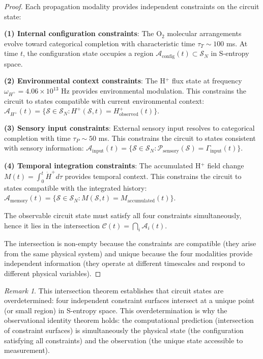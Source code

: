 \documentclass[aps,prd,twocolumn,superscriptaddress,floatfix,nofootinbib]{revtex4-2}
\theoremstyle{remark}
\newtheorem{remark}[theorem]{Remark}
\begin{document}
\begin{proof}
Each propagation modality provides independent constraints on the circuit state:

\textbf{(1) Internal configuration constraints}: The O$_2$ molecular arrangements evolve toward categorical completion with characteristic time $\tau_T \sim 100$ ms. At time $t$, the configuration state occupies a region $\mathcal{A}_{\text{config}}(t) \subset \mathcal{S}_N$ in S-entropy space.

\textbf{(2) Environmental context constraints}: The H$^+$ flux state at frequency $\omega_{H^+} = 4.06 \times 10^{13}$ Hz provides environmental modulation. This constrains the circuit to states compatible with current environmental context: $\mathcal{A}_{H^+}(t) = \{\mathcal{S} \in \mathcal{S}_N : H^+(\mathcal{S}, t) = H^+_{\text{observed}}(t)\}$.

\textbf{(3) Sensory input constraints}: External sensory input resolves to categorical completion with time $\tau_P \sim 50$ ms. This constrains the circuit to states consistent with sensory information: $\mathcal{A}_{\text{input}}(t) = \{\mathcal{S} \in \mathcal{S}_N : \mathcal{P}_{\text{sensory}}(\mathcal{S}) = \Gamma_{\text{input}}(t)\}$.

\textbf{(4) Temporal integration constraints}: The accumulated H$^+$ field change $M(t) = \int_0^t \dot{H}^+ d\tau$ provides temporal context. This constrains the circuit to states compatible with the integrated history: $\mathcal{A}_{\text{memory}}(t) = \{\mathcal{S} \in \mathcal{S}_N : M(\mathcal{S}, t) = M_{\text{accumulated}}(t)\}$.

The observable circuit state must satisfy all four constraints simultaneously, hence it lies in the intersection $\mathcal{C}(t) = \bigcap_i \mathcal{A}_i(t)$.

The intersection is non-empty because the constraints are compatible (they arise from the same physical system) and unique because the four modalities provide independent information (they operate at different timescales and respond to different physical variables).
\end{proof}

\begin{remark}
This intersection theorem establishes that circuit states are overdetermined: four independent constraint surfaces intersect at a unique point (or small region) in S-entropy space. This overdetermination is why the observational identity theorem holds: the computational prediction (intersection of constraint surfaces) is simultaneously the physical state (the configuration satisfying all constraints) and the observation (the unique state accessible to measurement).
\end{remark}
\end{document}
